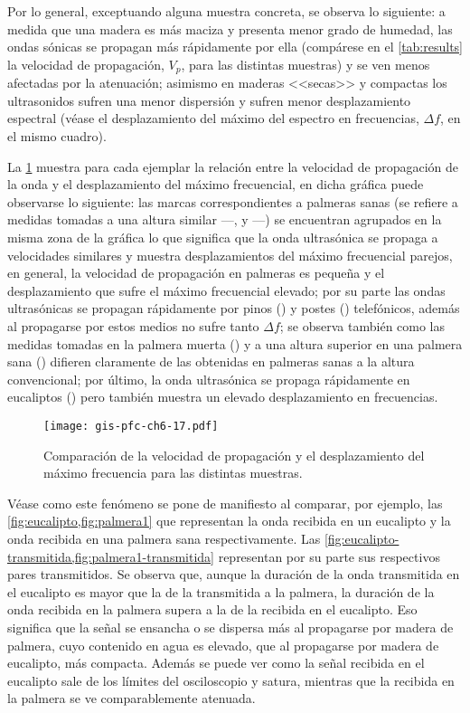 Por lo general, exceptuando alguna muestra concreta, se observa lo
siguiente: a medida que una madera es más maciza y presenta menor grado de
humedad, las ondas sónicas se propagan más rápidamente por ella (compárese
en el \cref{tab:results} la velocidad de propagación, $V_p$, para las
distintas muestras) y se ven menos afectadas por la atenuación; asimismo en
maderas <<secas>> y compactas los ultrasonidos sufren una menor dispersión
y sufren menor desplazamiento espectral (véase el desplazamiento del máximo
del espectro en frecuencias, $\Delta f$, en el mismo cuadro).

La \cref{fig:velfreq} muestra para cada ejemplar la relación entre la
velocidad de propagación de la onda y el desplazamiento del máximo
frecuencial, en dicha gráfica puede observarse lo siguiente: las marcas
correspondientes a palmeras sanas (se refiere a medidas tomadas a una
altura similar ---,  y ---) se encuentran
agrupados en la misma zona de la gráfica lo que significa que la onda
ultrasónica se propaga a velocidades similares y muestra desplazamientos
del máximo frecuencial parejos, en general, la velocidad de propagación en
palmeras es pequeña y el desplazamiento que sufre el máximo frecuencial
elevado; por su parte las ondas ultrasónicas se propagan rápidamente por
pinos () y postes () telefónicos, además al propagarse
por estos medios no sufre tanto $\Delta f$; se observa también como las
medidas tomadas en la palmera muerta () y a una altura superior
en una palmera sana () difieren claramente de las obtenidas en
palmeras sanas a la altura convencional; por último, la onda ultrasónica se
propaga rápidamente en eucaliptos () pero también muestra un
elevado desplazamiento en frecuencias.

\begin{figure}
    \begin{center}
	\texttt{[image: gis-pfc-ch6-17.pdf]}
    \end{center}
    \caption[Comparación de la $V_p$ y el $\Delta f$ para las distintas
    muestras.]{Comparación de la velocidad de propagación y el
    desplazamiento del máximo frecuencia para las distintas muestras.}
    \label{fig:velfreq}
\end{figure}

Véase como este fenómeno se pone de manifiesto al comparar, por ejemplo,
las \cref{fig:eucalipto,fig:palmera1} que representan la onda recibida en
un eucalipto y la onda recibida en una palmera sana respectivamente. Las
\cref{fig:eucalipto-transmitida,fig:palmera1-transmitida} representan por
su parte sus respectivos pares transmitidos. Se observa que, aunque la
duración de la onda transmitida en el eucalipto es mayor que la de la
transmitida a la palmera, la duración de la onda recibida en la palmera
supera a la de la recibida en el eucalipto. Eso significa que la señal se
ensancha o se dispersa más al propagarse por madera de palmera, cuyo
contenido en agua es elevado, que al propagarse por madera de eucalipto,
más compacta. Además se puede ver como la señal recibida en el eucalipto
sale de los límites del osciloscopio y satura, mientras que la recibida en
la palmera se ve comparablemente atenuada.


